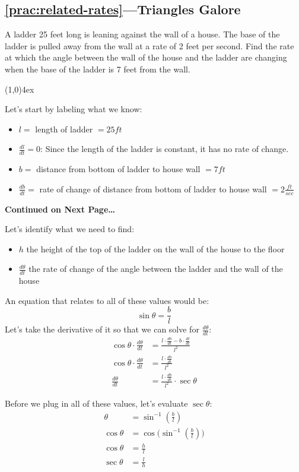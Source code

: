 \documentclass{MathNotes}
\newcommand{\continued}{
	\mbox{}
	\vfill
	\textbf{Continued on Next Page\ldots}\newpage
}
\newcommand{\br}{
	\begin{center}
		\line(1,0){4ex}
	\end{center}}
\begin{document}
\subsection*{\ref{prac:related-rates}---Triangles Galore}\label{ans:related-rates}
A ladder 25 feet long is leaning against the wall of a house. The base
of the ladder is pulled away from the wall at a rate of 2 feet per
second. Find the rate at which the angle between the wall of the house and the
ladder are changing when the base of the ladder is 7 feet from the wall.
\br
Let's start by labeling what we know:
\begin{multicols}{2}
	\begin{itemize}
		\item $l=$ length of ladder $=25ft$
		\item $\frac{dl}{dt}=0$: Since the length of the ladder is
		      constant, it has no rate of change.
		\item $b=$ distance from bottom of ladder to house wall $=7ft$
		\item $\frac{db}{dt}=$ rate of change of distance from bottom of ladder
		      to house wall $=2\frac{ft}{sec}$
	\end{itemize}
\end{multicols}
\continued
Let's identify what we need to find:
\begin{itemize}
	\item $h$ the height of the top of the ladder on the wall of the house
	      to the floor
	\item $\frac{d\theta}{dt}$ the rate of change of the angle between the
	      ladder and the wall of the house
\end{itemize}

An equation that relates to all of these values would be:
\[\sin\theta=\frac{b}{l}\]
Let's take the derivative of it so that we can solve for $\frac{d\theta}{dt}$:
\begin{align*}
	\cos\theta\cdot\frac{d\theta}{dt} & =\frac{l\cdot\frac{db}{dt}-b\cdot\frac{dl}{dt}}{l^2} \\
	\cos\theta\cdot\frac{d\theta}{dt} & =\frac{l\cdot\frac{db}{dt}}{l^2}                     \\
	\frac{d\theta}{dt}                & =\frac{l\cdot\frac{db}{dt}}{l^2}\cdot\sec\theta
\end{align*}

Before we plug in all of these values, let's evaluate $\sec\theta$:
\begin{align*}
	\theta     & =\sin^{-1}(\frac{b}{l})               \\
	\cos\theta & =\cos\big(\sin^{-1}(\frac{b}{l})\big) \\
	\cos\theta & =\frac{h}{l}                          \\
	\sec\theta & =\frac{l}{h}                          \\
\end{align*}
\end{document}
